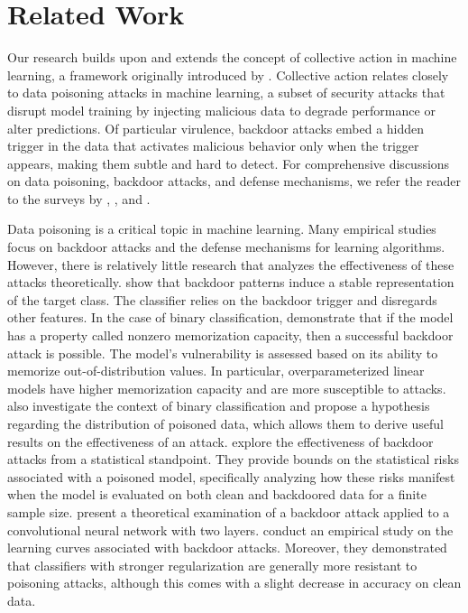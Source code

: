 \section{Related Work}
Our research builds upon and extends the concept of collective action in machine learning, a framework originally introduced by \citet{hardt2023collectiveaction}. Collective action relates closely to data poisoning attacks in machine learning, a subset of security attacks that disrupt model training by injecting malicious data to degrade performance or alter predictions. Of particular virulence, backdoor attacks embed a hidden trigger in the data that activates malicious behavior only when the trigger appears, making them subtle and hard to detect. For comprehensive discussions on data poisoning, backdoor attacks, and defense mechanisms, we refer the reader to the surveys by \citet{tian2022survey}, \citet{guo2021survey}, and \citet{cina2023survey}.

Data poisoning is a critical topic in machine learning. Many empirical studies focus on backdoor attacks and the defense mechanisms for learning algorithms. However, there is relatively little research that analyzes the effectiveness of these attacks theoretically. \citet{grosse2022backdoor} show that backdoor patterns induce a stable representation of the target class. The classifier relies on the backdoor trigger and disregards other features. In the case of binary classification, \citet{manoj2021backdoor} demonstrate that if the model has a property called nonzero memorization capacity, then a successful backdoor attack is possible. The model's vulnerability is assessed based on its ability to memorize out-of-distribution values. In particular,  overparameterized
linear models have higher memorization capacity and are more susceptible to attacks. \citet{xian2023understanding} also investigate the context of binary classification and propose a hypothesis regarding the distribution of poisoned data, which allows them to derive useful results on the effectiveness of an attack. \citet{wang2023demystifying} explore the effectiveness of backdoor attacks from a statistical standpoint. They provide bounds on the statistical risks associated with a poisoned model, specifically analyzing how these risks manifest when the model is evaluated on both clean and backdoored data for a finite sample size. \citet{li2024backdoorcnn} present a theoretical examination of a backdoor attack applied to a convolutional neural network with two layers. \citet{cina2022backdoorlearningcurvesexplaining}  conduct an empirical study on the learning curves associated with backdoor attacks. Moreover, they demonstrated that classifiers with stronger regularization are generally more resistant to poisoning attacks, although this comes with a slight decrease in accuracy on clean data. 

